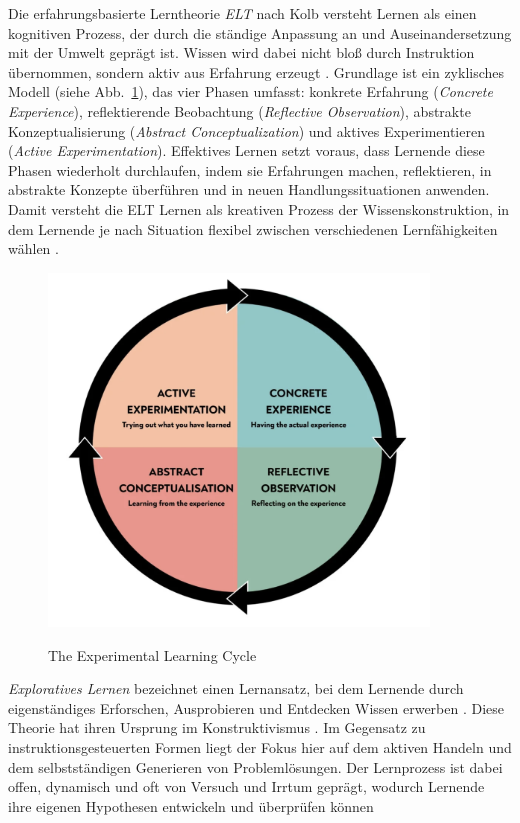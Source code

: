 Die erfahrungsbasierte Lerntheorie \textit{\ac{ELT}} nach Kolb versteht Lernen als einen kognitiven Prozess, der durch die ständige Anpassung an und Auseinandersetzung mit der Umwelt geprägt ist. Wissen wird dabei nicht bloß durch Instruktion übernommen, sondern aktiv aus Erfahrung erzeugt \parencite[S.~30]{bergsteiner_kolbs_2010}. Grundlage ist ein zyklisches Modell (siehe Abb.~\ref{fig:etl_cycle}), das vier Phasen umfasst: konkrete Erfahrung (\textit{Concrete Experience}), reflektierende Beobachtung (\textit{Reflective Observation}), abstrakte Konzeptualisierung (\textit{Abstract Conceptualization}) und aktives Experimentieren (\textit{Active Experimentation}). Effektives Lernen setzt voraus, dass Lernende diese Phasen wiederholt durchlaufen, indem sie Erfahrungen machen, reflektieren, in abstrakte Konzepte überführen und in neuen Handlungssituationen anwenden. Damit versteht die ELT Lernen als kreativen Prozess der Wissenskonstruktion, in dem Lernende je nach Situation flexibel zwischen verschiedenen Lernfähigkeiten wählen \parencite[S.~2--3]{mccarthy_experiential_2010}.

\begin{figure}[htbp]
    \centering
    \includegraphics[width=0.90\textwidth]{img/ELT_cycle.png}
    \caption{The Experimental Learning Cycle}
	\parencite{mcleod_kolbs_2025}
    \label{fig:etl_cycle}
\end{figure}

\textit{Exploratives Lernen} bezeichnet einen Lernansatz, bei dem Lernende durch eigenständiges Erforschen, Ausprobieren und Entdecken Wissen erwerben \parencite[S.~15]{grabinger_rich_2016}. Diese Theorie hat ihren Ursprung im Konstruktivismus \parencite[S.~271]{kornelsen_expedition_2005} . Im Gegensatz zu instruktionsgesteuerten Formen liegt der Fokus hier auf dem aktiven Handeln und dem selbstständigen Generieren von Problemlösungen. Der Lernprozess ist dabei offen, dynamisch und oft von Versuch und Irrtum geprägt, wodurch Lernende ihre eigenen Hypothesen entwickeln und überprüfen können \parencite[S.~141]{lucke_strukturierte_2005}

